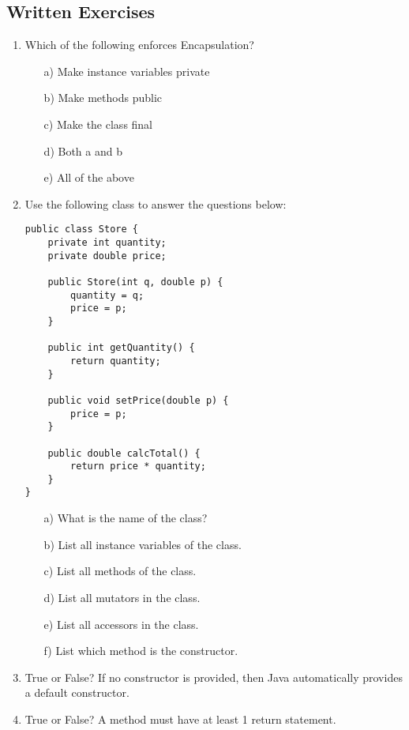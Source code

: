 \subsection{Written Exercises}

\setcounter{counter}{1}
\begin{enumerate}[label={\arabic{counter}\addtocounter{counter}{1}}.]

\item Which of the following enforces Encapsulation?
\begin{enumerate}
\item[a)]Make instance variables private
\item[b)]Make methods public
\item[c)]Make the class final
\item[d)]Both a and b
\item[e)]All of the above
\end{enumerate}

\item Use the following class to answer the questions below:
\label{question:store}
\begin{lstlisting}
public class Store {
	private int quantity;
	private double price;

	public Store(int q, double p) {
		quantity = q;
		price = p;
	}

	public int getQuantity() {
		return quantity;
	}

	public void setPrice(double p) {
		price = p;
	}

	public double calcTotal() {
		return price * quantity;
	}
}
\end{lstlisting}
\begin{enumerate}
\item[a)]What is the name of the class?
\item[b)]List all instance variables of the class.
\item[c)]List all methods of the class.
\item[d)]List all mutators in the class.
\item[e)]List all accessors in the class.
\item[f)]List which method is the constructor.
\end{enumerate}

\item True or False? If no constructor is provided, then Java automatically provides a default constructor.

\item True or False? A method must have at least 1 return statement.

\end{enumerate}

